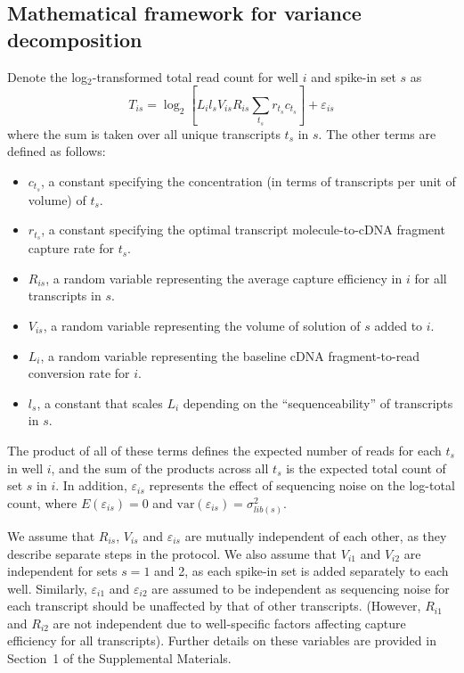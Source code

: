 \documentclass{article}
\newcommand{\suppsecmath}{1}
\newcommand\variance{\mbox{var}}
\begin{document}
\subsection*{Mathematical framework for variance decomposition}
Denote the log$_2$-transformed total read count for well $i$ and spike-in set $s$ as
\[
T_{is} = \log_2 \left[ L_i l_s V_{is} R_{is} \sum_{t_s} r_{t_s} c_{t_s} \right] + \varepsilon_{is}
\]
where the sum is taken over all unique transcripts $t_s$ in $s$.
The other terms are defined as follows:
\begin{itemize}
    \item $c_{t_s}$, a constant specifying the concentration (in terms of transcripts per unit of volume) of $t_s$.
    \item $r_{t_s}$, a constant specifying the optimal transcript molecule-to-cDNA fragment capture rate for $t_s$.
    \item $R_{is}$, a random variable representing the average capture efficiency in $i$ for all transcripts in $s$.
    \item $V_{is}$, a random variable representing the volume of solution of $s$ added to $i$.
    \item $L_i$, a random variable representing the baseline cDNA fragment-to-read conversion rate for $i$.
    \item $l_s$, a constant that scales $L_i$ depending on the ``sequenceability'' of transcripts in $s$.
\end{itemize}
The product of all of these terms defines the expected number of reads for each $t_s$ in well $i$, and the sum of the products across all $t_s$ is the expected total count of set $s$ in $i$.
In addition, $\varepsilon_{is}$ represents the effect of sequencing noise on the log-total count, where $E(\varepsilon_{is})=0$ and $\variance(\varepsilon_{is})= \sigma^2_{lib(s)}$.

We assume that $R_{is}$, $V_{is}$ and $\varepsilon_{is}$ are mutually independent of each other, as they describe separate steps in the protocol.
We also assume that $V_{i1}$ and $V_{i2}$ are independent for sets $s=1$ and 2, as each spike-in set is added separately to each well.
Similarly, $\varepsilon_{i1}$ and $\varepsilon_{i2}$ are assumed to be independent as sequencing noise for each transcript should be unaffected by that of other transcripts.
(However, $R_{i1}$ and $R_{i2}$ are not independent due to well-specific factors affecting capture efficiency for all transcripts).
Further details on these variables are provided in Section~\suppsecmath{} of the Supplemental Materials.
\end{document}
